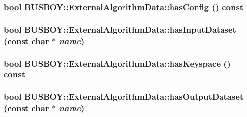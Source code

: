 \label{classBUSBOY_1_1ExternalAlgorithmData_a93aacf007a373effdc54ebc4dfd8bc62}
\hypertarget{classBUSBOY_1_1ExternalAlgorithmData_adfe93cb9bac11621edd95c2037d4c308}{
\subsubsection[{hasConfig}]{\setlength{\rightskip}{0pt plus 5cm}bool BUSBOY::ExternalAlgorithmData::hasConfig () const}}
\label{classBUSBOY_1_1ExternalAlgorithmData_adfe93cb9bac11621edd95c2037d4c308}
\hypertarget{classBUSBOY_1_1ExternalAlgorithmData_aa6011ef56deb9cb0af6e7b4d7a99e163}{
\subsubsection[{hasInputDataset}]{\setlength{\rightskip}{0pt plus 5cm}bool BUSBOY::ExternalAlgorithmData::hasInputDataset (const char $\ast$ {\em name})}}
\label{classBUSBOY_1_1ExternalAlgorithmData_aa6011ef56deb9cb0af6e7b4d7a99e163}
\hypertarget{classBUSBOY_1_1ExternalAlgorithmData_a85213fc0a8c757e3a264905788871ad3}{
\subsubsection[{hasKeyspace}]{\setlength{\rightskip}{0pt plus 5cm}bool BUSBOY::ExternalAlgorithmData::hasKeyspace () const}}
\label{classBUSBOY_1_1ExternalAlgorithmData_a85213fc0a8c757e3a264905788871ad3}
\hypertarget{classBUSBOY_1_1ExternalAlgorithmData_ab6b185983427eafc7309d42b5f28cffe}{
\subsubsection[{hasOutputDataset}]{\setlength{\rightskip}{0pt plus 5cm}bool BUSBOY::ExternalAlgorithmData::hasOutputDataset (const char $\ast$ {\em name})}}
